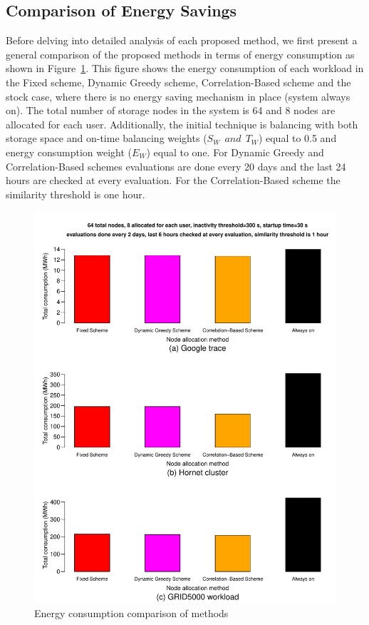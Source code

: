 \subsection{Comparison of Energy Savings}
Before delving into detailed analysis of each proposed method, we first present a general comparison
of the proposed methods in terms of energy consumption as shown in Figure~\ref{bigresult}. This figure
shows the energy consumption of each workload in the Fixed scheme, Dynamic Greedy scheme, Correlation-Based
scheme and the stock case, where there is no energy saving mechanism in place (system always on). The total
number of storage nodes in the system is 64 and 8 nodes are allocated for each user. Additionally, the initial
technique is balancing with both storage space and on-time balancing weights ($S_W\ \ and\ \ T_W$) equal to 0.5
and energy consumption weight ($E_W$)
equal to one. For Dynamic Greedy and Correlation-Based schemes evaluations are done every 20 days and
the last 24 hours are checked at every evaluation. For the Correlation-Based scheme the similarity threshold 
is one hour.

\begin{figure}[!htbp]
\centering
\includegraphics[width=\columnwidth,keepaspectratio]{FIG5.pdf}
\caption{Energy consumption comparison of methods}
\label{bigresult}
\end{figure}


